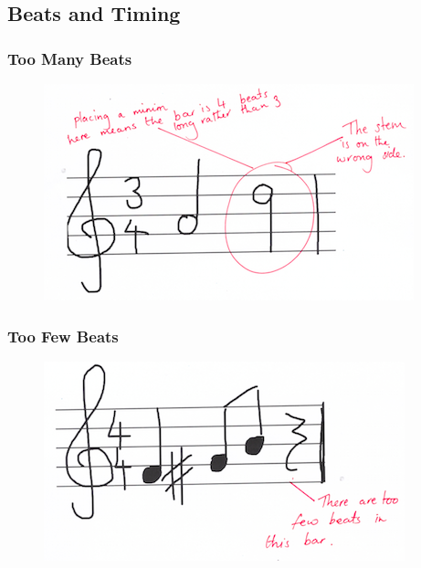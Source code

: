 \subsection{Beats and Timing}

\subsubsection{Too Many Beats}\label{sec:tf-beats-too-many}

\begin{figure}[H]
  \centering
  \includegraphics[width=.6\linewidth]{gfx/teacher-notes/mistake-beats-too-many.png}
  \caption{}
\end{figure}

\subsubsection{Too Few Beats}\label{sec:tf-beats-too-few}

\begin{figure}[H]
  \centering
  \includegraphics[width=.6\linewidth]{gfx/teacher-notes/mistake-beats-too-few.png}
  \caption{}
\end{figure}




